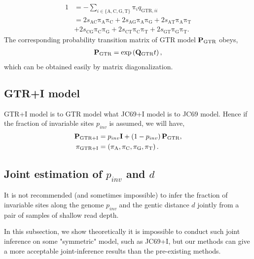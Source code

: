 \documentclass{article}
\begin{document}
\begin{align*}
    1&=-\sum_{i\in \{\mathrm{A,C,G,T}\}}\mathrm{\pi}_{i}q_{\mathrm{GTR},ii}\\
    &=2s_{\mathrm{AC}}\mathrm{\pi}_{\mathrm{A}}\mathrm{\pi}_{\mathrm{C}}+2s_{\mathrm{AG}}\mathrm{\pi}_{\mathrm{A}}\mathrm{\pi}_{\mathrm{G}}+2s_{\mathrm{AT}}\mathrm{\pi}_{\mathrm{A}}\mathrm{\pi}_{\mathrm{T}}\\
    &+2s_{\mathrm{CG}}\mathrm{\pi}_{\mathrm{C}}\mathrm{\pi}_{\mathrm{G}}+2s_{\mathrm{CT}}\mathrm{\pi}_{\mathrm{C}}\mathrm{\pi}_{\mathrm{T}}+2s_{\mathrm{GT}}\mathrm{\pi}_{\mathrm{G}}\mathrm{\pi}_{\mathrm{T}}.
\end{align*}
The corresponding probability transition matrix of GTR model ${\bf P}_{\mathrm{GTR}}$ obeys,
\begin{align*}
    {\bf P}_{\mathrm{GTR}} = \exp\left({\bf Q}_{\mathrm{GTR}}t\right),
\end{align*}
which can be obtained easily by matrix diagonalization.
\subsection{GTR+I model}\label{subsec:MLGTRI}
GTR+I model is to GTR model what JC69+I model is to JC69 model. Hence if the fraction of invariable sites $p_{inv}$ is assumed, we will have,
\begin{align*}
{\bf P}_{\mathrm{GTR+I}}&=p_{inv}{\bf I}+\left(1-p_{inv}\right){\bf P}_{\mathrm{GTR}},\\
\mathrm{\pi}_{\mathrm{GTR+I}}&=\left(\mathrm{\pi}_{\mathrm{A}},\mathrm{\pi}_{\mathrm{C}},\mathrm{\pi}_{\mathrm{G}},\mathrm{\pi}_{\mathrm{T}}\right).
\end{align*}
\subsection{Joint estimation of $p_{inv}$ and $d$}
It is not recommended (and sometimes impossible) to infer the fraction of invariable sites along the genome $p_{inv}$ and the gentic distance $d$ jointly from a pair of samples of shallow read depth. 

In this subsection, we show theoretically it is impossible to conduct such joint inference on some "symmetric" model, such as JC69+I, but our methods can give a more acceptable joint-inference results than the pre-existing methods.
\end{document}
